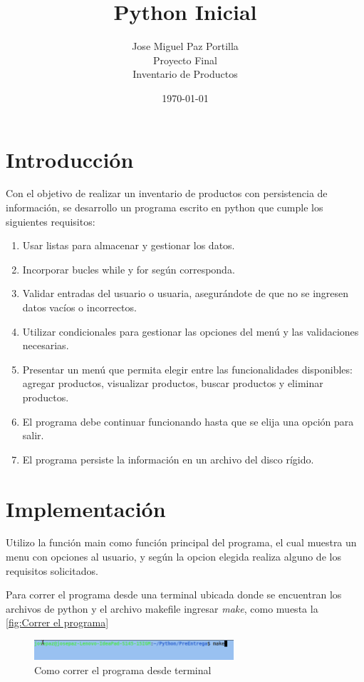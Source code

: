 \documentclass[12pt]{article}
\title{Python Inicial}
\author{Jose Miguel Paz Portilla\\Proyecto Final\\Inventario de Productos}
\date{\today}
\begin{document}
\maketitle
\thispagestyle{empty}
\newpage

\tableofcontents
\newpage

\section{Introducción}

Con el objetivo de realizar un inventario de productos con persistencia de información, se desarrollo un programa escrito en python que cumple los siguientes requisitos:

\begin{enumerate}
	\item Usar listas para almacenar y gestionar los datos.
	\item Incorporar bucles while y for según corresponda. 
	\item Validar entradas del usuario o usuaria, asegurándote de que no se ingresen datos vacíos o incorrectos.
	\item Utilizar condicionales para gestionar las opciones del menú y las validaciones necesarias.
	\item Presentar un menú que permita elegir entre las funcionalidades disponibles: agregar productos, visualizar productos, buscar productos y eliminar productos.
	\item El programa debe continuar funcionando hasta que se elija una opción para salir.
	\item El programa persiste la información en un archivo del disco rígido.
\end{enumerate}

\section{Implementación}

Utilizo la función main como función principal del programa, el cual muestra un menu con opciones al usuario, y según la opcion elegida realiza alguno de los requisitos solicitados.

Para correr el programa desde una terminal ubicada donde se encuentran los archivos de python y el archivo makefile ingresar \textit{make}, como muesta la \autoref{fig:Correr el programa}

\begin{figure}[H]
	\centering
	\setlength{\fboxrule}{0pt}
	\includegraphics[width=0.66\textwidth]{Imagenes/img0.png}
	\caption{Como correr el programa desde terminal}
	\label{fig:Correr el programa}
\end{figure}  
\end{document}
